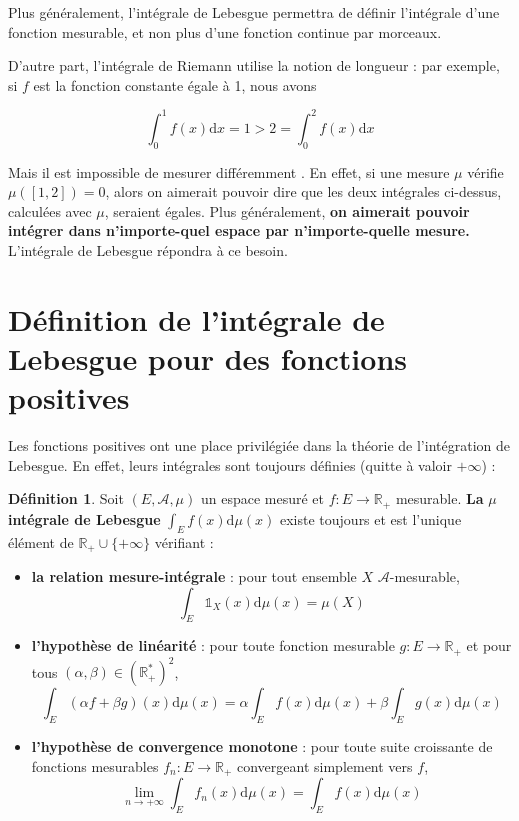 \documentclass[french]{report}
\theoremstyle{plain}
\theoremstyle{definition}
\newtheorem{defi}{Définition}[section]
\theoremstyle{remark}
\newcommand\itemb{\item[$\bullet$]}
\begin{document}
Plus généralement, l'intégrale de Lebesgue permettra de définir l'intégrale d'une fonction mesurable, et non plus d'une fonction continue par morceaux.

D'autre part, l'intégrale de Riemann utilise la notion de longueur :
par exemple, si $f$ est la fonction constante égale à 1, nous avons

$$
\int_0^1f(x)\text{d}x = 1 > 2 = \int_0^2f(x)\text{d}x
$$

Mais il est impossible de \og mesurer différemment \fg.
En effet, si une mesure $\mu$ vérifie $\mu\left(\left[1,2\right]\right)=0$, alors on aimerait pouvoir dire que les deux intégrales ci-dessus, calculées avec $\mu$, seraient égales.
Plus généralement, \textbf{on aimerait pouvoir intégrer dans n'importe-quel espace par n'importe-quelle mesure.}
L'intégrale de Lebesgue répondra à ce besoin.

\section{Définition de l'intégrale de Lebesgue pour des fonctions positives}
\label{sect:defintpos}
Les fonctions positives ont une place privilégiée dans la théorie de l'intégration de Lebesgue.
En effet, leurs intégrales sont toujours définies (quitte à valoir $+\infty$) :

\begin{defi}
  Soit $\left(E,\mathcal{A},\mu\right)$ un espace mesuré et $f:E\rightarrow\mathbb{R}_+$ mesurable.
  \textbf{La } $\mu $\textbf{ intégrale de Lebesgue } $\displaystyle\int_Ef(x)\text{d}\mu(x)$ existe toujours et est l'unique élément de $\mathbb{R}_+\cup\{+\infty\}$ vérifiant :
  \begin{itemize}
    \itemb \textbf{la relation mesure-intégrale} : pour tout ensemble $X$ $\mathcal{A}$-mesurable,
    $$
    \int_E\mathds{1}_X(x)\text{d}\mu(x)=\mu(X)
    $$ 
    \itemb \textbf{l'hypothèse de linéarité} : pour toute fonction mesurable $g:E\rightarrow\mathbb{R}_+$ et pour tous $\left(\alpha,\beta\right) \in \left(\mathbb{R}_+^*\right)^2$,
    $$
    \int_E (\alpha f + \beta g)(x) \text{d}\mu(x)=\alpha\int_Ef(x)\text{d}\mu(x) + \beta\int_Eg(x)\text{d}\mu(x)
    $$
    \itemb \textbf{l'hypothèse de convergence monotone} : pour toute suite croissante de fonctions mesurables $f_n:E\rightarrow\mathbb{R}_+$ convergeant simplement vers $f$,
    $$
    \lim_{n\rightarrow+\infty}\int_Ef_n(x)\text{d}\mu(x)=\int_Ef(x)\text{d}\mu(x)
    $$
  \end{itemize}
\end{defi}
\end{document}
